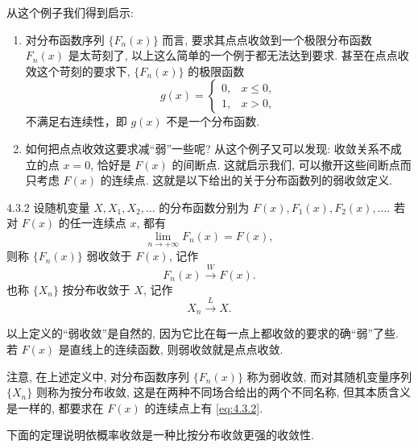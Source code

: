 从这个例子我们得到启示:
\begin{enumerate}
    \item 对分布函数序列 $ \{ F_n (x) \} $ 而言, 要求其点点收敛到一个极限分布函数 $ F_n (x) $ 是太苛刻了, 以上这么简单的一个例于都无法达到要求.
    甚至在点点收效这个苛刻的要求下, $ \{ F_n (x) \} $ 的极限函数
    \begin{equation*}
        g (x) =
        \begin{cases}
            0, & x \leq 0,\\
            1, & x > 0,
        \end{cases}
    \end{equation*}
    不满足右连续性，即 $ g (x) $ 不是一个分布函数.
    \item 如何把点点收效这要求减``弱''一些呢?
    从这个例子又可以发现: 收敛关系不成立的点 $ x=0 $, 恰好是 $ F (x) $ 的间断点.
    这就启示我们, 可以撤开这些间断点而只考虑 $ F (x) $ 的连续点.
    这就是以下给出的关于分布函数列的弱收敛定义.
\end{enumerate}

\begin{definition}{}{4.3.2}
    设随机变量 $ X, X_1,  X_2, \dotsc $  的分布函数分别为 $ F (x), F_1 (x), F_2 (x), \dotsc $.
    若对 $ F (x) $ 的任一连续点 $x$, 都有
    \begin{equation}\label{eq:4.3.2}
        \lim_{n \to +\infty} F_n (x) = F (x),
    \end{equation}
    则称 $ \{ F_n (x) \} $ {\heiti 弱收敛}于 $ F (x) $, 记作
    \begin{equation}\label{eq:4.3.3}
        F_n (x) \stackrel{W}{\to} F (x).
    \end{equation}
    也称 $ \{ X_n \} $ {\heiti 按分布收敛}于 $ X $, 记作
    \begin{equation}\label{eq:4.3.4}
        X_n \stackrel{L}{\to} X.
    \end{equation}
\end{definition}

以上定义的``弱收敛''是自然的, 因为它比在每一点上都收敛的要求的确``弱''了些.
若 $ F (x) $ 是直线上的连续函数, 则弱收敛就是点点收敛.

注意, 在上述定义中, 对分布函数序列 $ \{ F_n (x) \} $ 称为弱收敛, 而对其随机变量序列 $ \{ X_n \} $ 则称为按分布收敛, 这是在两种不同场合给出的两个不同名称, 但其本质含义是一样的, 都要求在 $ F (x) $ 的连续点上有 \eqref{eq:4.3.2}.

下面的定理说明依概率收敛是一种比按分布收敛更强的收敛性.


